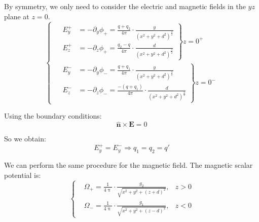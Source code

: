 By symmetry, we only need to consider the electric and magnetic fields in the $yz$ plane at $z=0$.
\begin{equation}
    \left\{
    \begin{aligned}
        & \left. 
        \begin{aligned}
            E_y^+ &= -\partial_y \phi_+ = \frac{q+q_2}{4\pi} \cdot \frac{y}{(x^2+y^2+d^2)^{\frac{3}{2}}} \\
            E_z^+ &= -\partial_z \phi_+ = \frac{q_2-q}{4\pi} \cdot \frac{d}{(x^2+y^2+d^2)^{\frac{3}{2}}}
        \end{aligned} 
        \right\} z=0^+ \\[10pt]
        & \left. 
        \begin{aligned}
            E_y^- &= -\partial_y \phi_- = \frac{q+q_1}{4\pi} \cdot \frac{y}{(x^2+y^2+d^2)^{\frac{3}{2}}} \\
            E_z^- &= -\partial_z \phi_- = \frac{-(q+q_1)}{4\pi} \cdot \frac{d}{(x^2+y^2+d^2)^{\frac{3}{2}}}
        \end{aligned} 
        \right\} z=0^-
    \end{aligned}
    \right.
\end{equation}

Using the boundary conditions:
\begin{equation}
\bm{\hat{n}} \times \bm{E} = 0
\end{equation}

So we obtain:
\begin{equation}
E_y^+ = E_y^- \Rightarrow q_1 = q_2 = q'
\end{equation}

We can perform the same procedure for the magnetic field.
The magnetic scalar potential is:
\begin{equation}
\left\{
\begin{aligned}
&\Omega_+ = \frac{1}{4\uppi} \cdot \frac{g_2}{\sqrt{x^2+y^2+(z+d)^2}} , & z > 0 \\
&\Omega_- = \frac{1}{4\uppi} \cdot \frac{g_1}{\sqrt{x^2+y^2+(z-d)^2}} , & z < 0
\end{aligned}
\right.
\end{equation}

